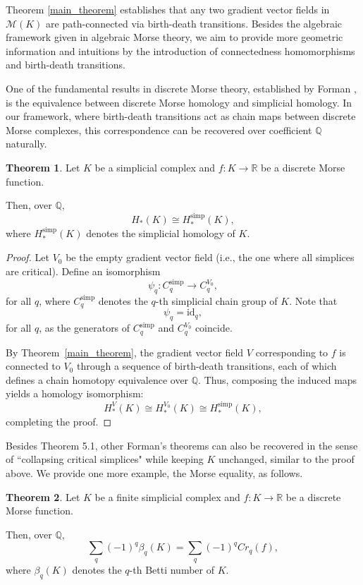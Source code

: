 \documentclass[a4paper,12pt,notitlepage]{amsart}
\theoremstyle{definition}%
\newtheorem{theorem}{Theorem}[section]
\theoremstyle{definition}%
\theoremstyle{definition}%
\newcommand{\id}{\text{id}}
\newcommand{\M}{\mathcal{M}}
\newcommand{\R}{\mathbb{R}}
\begin{document}
Theorem \ref{main_theorem} establishes 
that any two gradient vector fields in
$\M(K) $ are path-connected via birth-death transitions.
Besides the algebraic framework given in algebraic Morse theory, 
we aim to provide more geometric information and 
intuitions by the introduction of connectedness homomorphisms
and birth-death transitions.

One of the 
fundamental results in discrete Morse theory, 
established by Forman \cite{Forman_guide}, is the equivalence
 between discrete Morse homology and simplicial homology. 
 In our framework, where birth-death transitions act as chain maps between discrete Morse complexes, 
 this correspondence can be recovered over coefficient 
$ \mathbb{Q}$
 naturally.


\begin{theorem} \cite[Theorem 7.1]{Forman_guide}
\label{thm:homology-isomorphism}
Let $K$ be a simplicial complex  and 
$f: K \to \R$
be a discrete Morse function.

Then,  over $\mathbb{Q}$,
$$H_{\ast}(K) \cong H_{\ast}^{\text{simp}}(K),$$
where 
$H_{\ast}^{\text{simp}}(K)$
denotes the simplicial homology of $K$.
\end{theorem}



\begin{proof}
Let $V_0$ be the empty gradient vector field 
(i.e., the one where all simplices are critical).
Define an 
isomorphism 
$$\psi_q: C_q ^{\text{simp}}  \to C_{q} ^{V_0},$$
for all $q$,
where $C_q ^{\text{simp}} $ denotes the
$q$-th simplicial chain group of $K$.
Note that $$\psi_q= \id_q,$$
for all $q$,
as the generators of $C_q ^{\text{simp}} $ and 
$C_{q} ^{V_0} $ coincide.


By Theorem~\ref{main_theorem}, the gradient vector field $V$ corresponding to  $f$
 is connected to $V_0$ 
 through a sequence of birth-death transitions, 
 each of which defines a chain homotopy equivalence over $\mathbb{Q}$. 
 Thus, composing the induced maps yields a homology isomorphism:
 \[H_{\ast}^V(K) \cong H_{\ast}^{V_0}(K) \cong H_{\ast}^{\text{simp}}(K),\]
 completing the proof.
\end{proof}




Besides Theorem 5.1,
other Forman's theorems can also be recovered in the sense
of ``collapsing critical simplices" while keeping $K$ unchanged, similar to the proof above.
We provide one more example, the Morse equality, as follows.

\begin{theorem}\cite[Theorem 2.11]{Forman_guide}
\label{thm:morse_equality}
Let $K$ be a finite simplicial complex and 
$f:K \to \R$ be a discrete Morse function.

Then, over $\mathbb{Q}$,
$$\sum_q (-1)^q \beta_q(K)=\sum_q (-1)^q Cr_q(f),$$
where 
$\beta_q(K)$ denotes the $q$-th Betti number 
of $K$.
\end{theorem}
\end{document}
